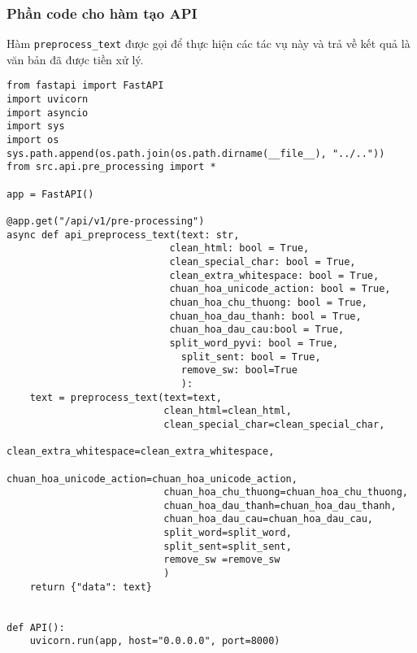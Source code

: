 \subsubsection{Phần code cho hàm tạo API}
Hàm \texttt{preprocess\_text} được gọi để thực hiện các tác vụ này và trả về kết quả là văn bản đã được tiền xử lý.
\begin{verbatim}
from fastapi import FastAPI
import uvicorn
import asyncio
import sys
import os
sys.path.append(os.path.join(os.path.dirname(__file__), "../.."))
from src.api.pre_processing import *

app = FastAPI()

@app.get("/api/v1/pre-processing")
async def api_preprocess_text(text: str,
                            clean_html: bool = True,
                            clean_special_char: bool = True,
                            clean_extra_whitespace: bool = True,
                            chuan_hoa_unicode_action: bool = True,
                            chuan_hoa_chu_thuong: bool = True,
                            chuan_hoa_dau_thanh: bool = True,
                            chuan_hoa_dau_cau:bool = True,
                            split_word_pyvi: bool = True,
                              split_sent: bool = True,
                              remove_sw: bool=True
                              ):
    text = preprocess_text(text=text,
                           clean_html=clean_html,
                           clean_special_char=clean_special_char,
                           clean_extra_whitespace=clean_extra_whitespace,
                           chuan_hoa_unicode_action=chuan_hoa_unicode_action,
                           chuan_hoa_chu_thuong=chuan_hoa_chu_thuong,
                           chuan_hoa_dau_thanh=chuan_hoa_dau_thanh,
                           chuan_hoa_dau_cau=chuan_hoa_dau_cau,
                           split_word=split_word,
                           split_sent=split_sent,
                           remove_sw =remove_sw
                           )
    return {"data": text}


def API():
    uvicorn.run(app, host="0.0.0.0", port=8000)
\end{verbatim}
